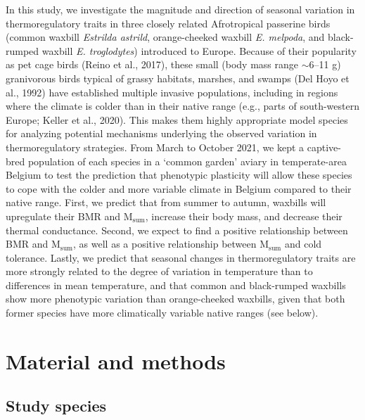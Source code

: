 \documentclass[10pt, twoside]{book} %
\begin{document}
In this study, we investigate the magnitude and direction of seasonal variation in thermoregulatory traits in three closely related Afrotropical passerine birds (common waxbill \textit{Estrilda astrild}, orange-cheeked waxbill \textit{E. melpoda}, and black-rumped waxbill \textit{E. troglodytes}) introduced to Europe. Because of their popularity as pet cage birds (Reino et al., 2017), these small (body mass range $\sim$6–11 g) granivorous birds typical of grassy habitats, marshes, and swamps (Del Hoyo et al., 1992) have established multiple invasive populations, including in regions where the climate is colder than in their native range (e.g., parts of south-western Europe; Keller et al., 2020). This makes them highly appropriate model species for analyzing potential mechanisms underlying the observed variation in thermoregulatory strategies. From March to October 2021, we kept a captive-bred population of each species in a ‘common garden’ aviary in temperate-area Belgium to test the prediction that phenotypic plasticity will allow these species to cope with the colder and more variable climate in Belgium compared to their native range. First, we predict that from summer to autumn, waxbills will upregulate their BMR and M$_{\text{sum}}$, increase their body mass, and decrease their thermal conductance. Second, we expect to find a positive relationship between BMR and M$_{\text{sum}}$, as well as a positive relationship between M$_{\text{sum}}$ and cold tolerance. Lastly, we predict that seasonal changes in thermoregulatory traits are more strongly related to the degree of variation in temperature than to differences in mean temperature, and that common and black-rumped waxbills show more phenotypic variation than orange-cheeked waxbills, given that both former species have more climatically variable native ranges (see below).\\

\section{Material and methods}
\renewcommand\thesection{\arabic{chapter}.\arabic{section}}
\renewcommand{\thefigure}{\arabic{chapter}.\arabic{figure}}


\subsection{Study species}
\end{document}
